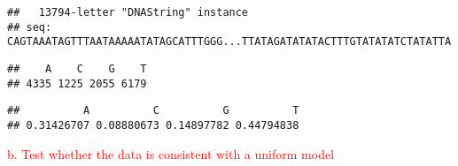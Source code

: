 \documentclass[]{article}
\newenvironment{Shaded}{\begin{snugshade}}{\end{snugshade}}
\newcommand{\KeywordTok}[1]{\textcolor[rgb]{0.13,0.29,0.53}{\textbf{#1}}}
\newcommand{\DataTypeTok}[1]{\textcolor[rgb]{0.13,0.29,0.53}{#1}}
\newcommand{\DecValTok}[1]{\textcolor[rgb]{0.00,0.00,0.81}{#1}}
\newcommand{\StringTok}[1]{\textcolor[rgb]{0.31,0.60,0.02}{#1}}
\newcommand{\OperatorTok}[1]{\textcolor[rgb]{0.81,0.36,0.00}{\textbf{#1}}}
\newcommand{\NormalTok}[1]{#1}
\begin{document}
\begin{verbatim}
##   13794-letter "DNAString" instance
## seq: CAGTAAATAGTTTAATAAAAATATAGCATTTGGG...TTATAGATATATACTTTGTATATATCTATATTA
\end{verbatim}

\begin{Shaded}
\end{Shaded}

\begin{verbatim}
##    A    C    G    T 
## 4335 1225 2055 6179
\end{verbatim}

\begin{Shaded}
\end{Shaded}

\begin{verbatim}
##          A          C          G          T 
## 0.31426707 0.08880673 0.14897782 0.44794838
\end{verbatim}

\textcolor{red}{b. Test whether the data is consistent with a uniform model}

\begin{Shaded}
\end{Shaded}
\end{document}
